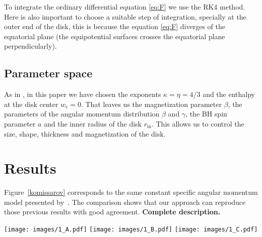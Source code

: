\documentclass{aa}
\begin{document}
To integrate the ordinary differential equation \eqref{eq:F} we use the RK4 method. Here is also important to choose a suitable step of integration, specially at the outer end of the disk, this is because the equation \eqref{eq:F} diverges of the equatorial plane (the equipotential surfaces crosses the equatorial plane perpendicularly).

\subsection{Parameter space}

As in \citet{Komissarov:2006}, in this paper we have chosen the exponents $\kappa = \eta = 4/3$ and the enthalpy at the disk center $w_{\mathrm{c}} = 0$. That leaves us the magnetization parameter $\beta$, the parameters of the angular momentum distribution $\beta$ and $\gamma$, the BH spin parameter $a$ and the inner radius of the disk $r_{\mathrm{in}}$. This allows us to control the size, shape, thickness and magnetization of the disk.

\section{Results}

Figure~\ref{komissarov} corresponds to the same constant specific angular momentum model presented by~\citet{Komissarov:2006}. The comparison shows that our approach can reproduce those previous results with good agreement. {\bf Complete description.}

\begin{figure*}
\centering
\texttt{[image: images/1\_A.pdf]}
\hspace{-0.3cm}
\texttt{[image: images/1\_B.pdf]}
\hspace{-0.2cm}
\texttt{[image: images/1\_C.pdf]}
\caption{Comparison with Komissarov's solution for a constant angular momentum model.}
           \label{komissarov}%
 \end{figure*}


\end{document}

